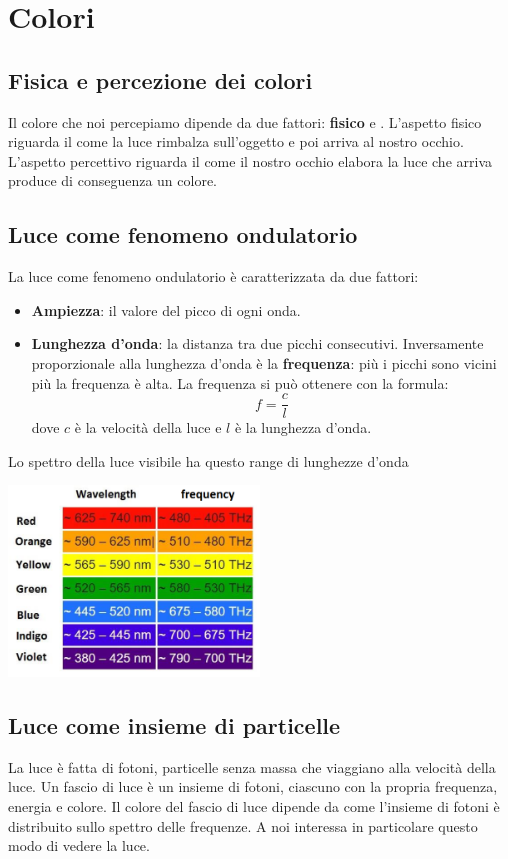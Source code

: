 \chapter{Colori}

\section{Fisica e percezione dei colori}
Il colore che noi percepiamo dipende da due fattori: \textbf{fisico} e \textbf{}.
L'aspetto fisico riguarda il come la luce rimbalza sull'oggetto e poi arriva al
nostro occhio. L'aspetto percettivo riguarda il come il nostro occhio elabora la
luce che arriva produce di conseguenza un colore.

\section{Luce come fenomeno ondulatorio}
La luce come fenomeno ondulatorio \`e caratterizzata da due fattori:
\begin{itemize}
	\item \textbf{Ampiezza}: il valore del picco di ogni onda.
	\item \textbf{Lunghezza d'onda}: la distanza tra due picchi consecutivi. Inversamente
	      proporzionale alla lunghezza d'onda \`e la \textbf{frequenza}: pi\`u i picchi sono
	      vicini pi\`u la frequenza \`e alta. La frequenza si pu\`o ottenere con la formula:
	      \[ f = \frac{c}{l} \]
	      dove $c$ \`e la velocit\`a della luce e $l$ \`e la lunghezza d'onda.
\end{itemize}
Lo spettro della luce visibile ha questo range di lunghezze d'onda

\begin{center}
	\includegraphics[width=0.5\textwidth]{Immagini/Spettro visibile}
\end{center}

\section{Luce come insieme di particelle}
La luce \`e fatta di fotoni, particelle senza massa che viaggiano alla velocit\`a della luce.
Un fascio di luce \`e un insieme di fotoni, ciascuno con la propria frequenza, energia e
colore. Il colore del fascio di luce dipende da come l'insieme di fotoni \`e distribuito sullo
spettro delle frequenze. A noi interessa in particolare questo modo di vedere la luce.

